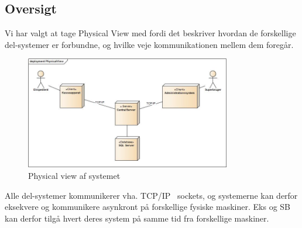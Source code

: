 \subsection{Oversigt}

Vi har valgt at tage Physical View med fordi det beskriver hvordan de forskellige del-systemer er forbundne, og hvilke veje kommunikationen mellem dem foregår.

\begin{figure}[htb]
    \centering
    \includegraphics[width=0.8\textwidth]{Systemarkitektur/PhysicalView/Billeder/PhysicalView.jpg}
    \caption{Physical view af systemet}
    \label{fig:physicalview}
\end{figure}

Alle del-systemer kommunikerer vha. TCP/IP~\cite{TCPIP} sockets, og systemerne kan derfor eksekvere og kommunikere asynkront på forskellige fysiske maskiner. \gls{Eks} og \gls{SB} kan derfor tilgå hvert deres system på samme tid fra forskellige maskiner.